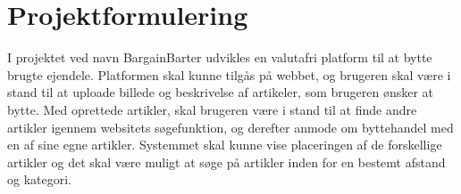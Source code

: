 \chapter{Projektformulering}

I projektet ved navn BargainBarter udvikles en valutafri platform til at bytte brugte ejendele. Platformen skal kunne tilgås på webbet, og brugeren skal være i stand til at uploade billede og beskrivelse af artikeler, som brugeren ønsker at bytte. Med oprettede artikler, skal brugeren være i stand til at finde andre artikler igennem websitets søgefunktion, og derefter anmode om byttehandel med en af sine egne artikler. Systemmet skal kunne vise placeringen af de forskellige artikler og det skal være muligt at søge på artikler inden for en bestemt afstand og kategori.      
